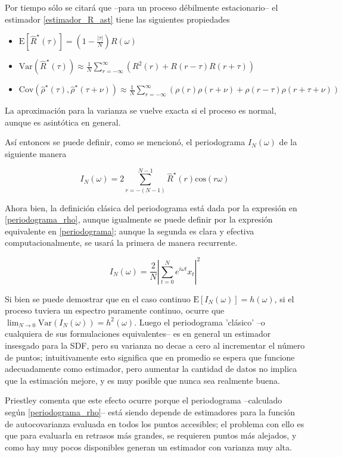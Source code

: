 \documentclass[12pt,a4paper]{mitthesis}
\newcommand{\aste}[1]{\widehat{ #1 }^{\star}}
\newcommand{\COS}[1]{\mathrm{cos}\left( #1 \right)}
\newcommand{\E}[1]{\mathrm{E}\left[ #1 \right]}
\newcommand{\Var}[1]{\mathrm{Var}\left( #1 \right)}
\newcommand{\Cov}[1]{\mathrm{Cov}\left( #1 \right)}
\newcommand{\abso}[1]{\left| #1 \right|}
\begin{document}
Por tiempo s\'olo se citar\'a que --para un proceso d\'ebilmente estacionario-- el estimador 
\ref{estimador_R_ast} tiene las siguientes propiedades
\begin{itemize}
\item $\E{\aste{R}(\tau)} = \left(1 - \frac{\abso{\tau}}{N} \right) R(\omega)$
\item $\Var{\aste{R}(\tau)} \approx \frac{1}{N} 
\sum_{r=-\infty}^{\infty} \left( R^{2}(r) + R(r-\tau)R(r+\tau) \right)$
\item $\Cov{\aste{\rho}(\tau),\aste{\rho}(\tau+\nu)} \approx \frac{1}{N} 
\sum_{r=-\infty}^{\infty} \left( \rho(r)\rho(r+\nu) + \rho(r-\tau)\rho(r+\tau+\nu) \right)$
\end{itemize}
La aproximaci\'on para la varianza se vuelve exacta si el proceso es normal, aunque es asint\'otica 
en general.

As\'i entonces se puede definir, como se mencion\'o, el periodograma $I_N(\omega)$ de la siguiente 
manera

\begin{equation}
I_N(\omega) = 2 \sum_{r = -(N-1)}^{N-1} \aste{R}(r) \COS{r \omega}
\label{periodograma_rho}
\end{equation}

Ahora bien, la definici\'on cl\'asica del periodograma est\'a dada por la expresi\'on en 
\ref{periodograma_rho}, aunque igualmente se puede definir por la expresi\'on equivalente en 
\ref{periodograma}; aunque la segunda es clara y efectiva computacionalmente, se usar\'a la primera 
de manera recurrente.

\begin{equation}
I_N(\omega) = \frac{2}{N} \abso{ \sum_{t=0}^{N} e^{i \omega t} x_t }^{2}
\label{periodograma}
\end{equation}

Si bien se puede demostrar que en el caso continuo $\E{I_N(\omega)}=h(\omega)$, si el proceso 
tuviera un espectro puramente continuo, ocurre que 
$\lim_{N\rightarrow 0} \Var{I_N(\omega)} = h^{2}(\omega)$. Luego el periodograma 'cl\'asico' --o 
cualquiera de sus formulaciones equivalentes-- es en general un estimador insesgado para la SDF, 
pero su varianza no decae a cero al incrementar el n\'umero de puntos; intuitivamente esto significa 
que en promedio se espera que funcione adecuadamente como estimador, pero aumentar la cantidad de 
datos no implica que la estimaci\'on mejore, y es muy posible que nunca sea realmente buena.

Priestley comenta que este efecto ocurre porque el periodograma --calculado seg\'un 
\ref{periodograma_rho}-- est\'a siendo depende de estimadores para la funci\'on de autocovarianza 
evaluada en todos los puntos accesibles; el problema con ello es que para evaluarla en retrasos 
m\'as grandes, se requieren puntos m\'as alejados, y como hay muy pocos disponibles generan un 
estimador con varianza muy alta.
\end{document}

